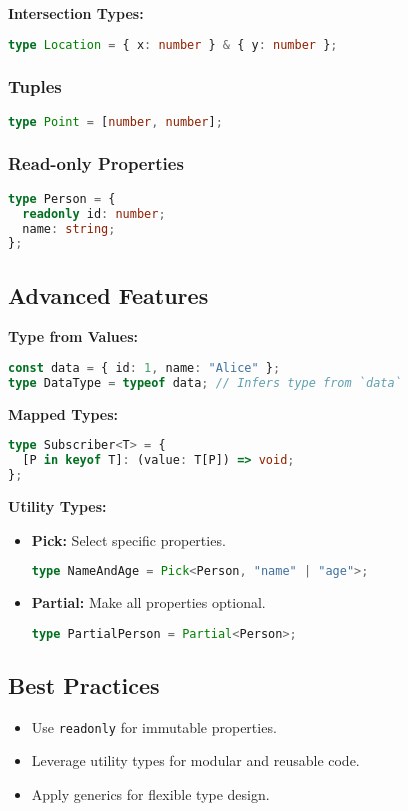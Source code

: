\documentclass[a4paper,12pt]{article}
\begin{document}
\textbf{Intersection Types:}
\begin{lstlisting}[language=TypeScript]
type Location = { x: number } & { y: number };
\end{lstlisting}

\subsubsection*{Tuples}
\begin{lstlisting}[language=TypeScript]
type Point = [number, number];
\end{lstlisting}

\subsubsection*{Read-only Properties}
\begin{lstlisting}[language=TypeScript]
type Person = {
  readonly id: number;
  name: string;
};
\end{lstlisting}

\subsection*{Advanced Features}
\textbf{Type from Values:}
\begin{lstlisting}[language=TypeScript]
const data = { id: 1, name: "Alice" };
type DataType = typeof data; // Infers type from `data`
\end{lstlisting}

\textbf{Mapped Types:}
\begin{lstlisting}[language=TypeScript]
type Subscriber<T> = {
  [P in keyof T]: (value: T[P]) => void;
};
\end{lstlisting}

\textbf{Utility Types:}
\begin{itemize}
    \item \textbf{Pick:} Select specific properties.
    \begin{lstlisting}[language=TypeScript]
    type NameAndAge = Pick<Person, "name" | "age">;
    \end{lstlisting}
    \item \textbf{Partial:} Make all properties optional.
    \begin{lstlisting}[language=TypeScript]
    type PartialPerson = Partial<Person>;
    \end{lstlisting}
\end{itemize}

\subsection*{Best Practices}
\begin{itemize}
    \item Use \texttt{readonly} for immutable properties.
    \item Leverage utility types for modular and reusable code.
    \item Apply generics for flexible type design.
\end{itemize}
\end{document}

